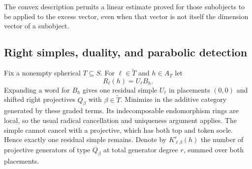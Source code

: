 The convex description permits a linear estimate proved for those
subobjects to be applied to the excess vector, even when that vector is
not itself the dimension vector of a subobject.

\subsection{Right simples, duality, and parabolic detection}

Fix a nonempty spherical $T\subseteq S$.  For $\ell\in\widetilde T$
and $h\in A_T$ let
\[
 R_\ell(h)=U_\ell B_h.
\]
Expanding a word for $B_h$ gives one residual simple $U_\ell$ in
placements $(0,0)$ and shifted right projectives $Q_\beta$ with
$\beta\in\widetilde T$.  Minimize in the additive category generated
by these graded terms.  Its indecomposable endomorphism rings are local,
so the usual radical cancellation and uniqueness argument applies.
The simple cannot cancel with a projective, which has both top and
token socle.  Hence exactly one residual simple remains.  Denote by
$K^r_{\ell\beta}(h)$ the number of projective generators of type
$Q_\beta$ at total generator degree $r$, summed over both placements.

